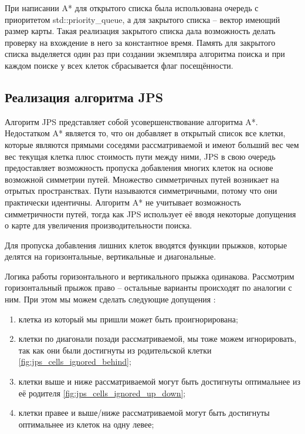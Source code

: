 При написании A* для открытого списка была использована очередь с приоритетом std::priority\_queue, а для закрытого списка -- вектор имеющий размер карты. Такая реализация закрытого списка дала возможность делать проверку на вхождение в него за константное время. Память для закрытого списка выделяется один раз при создании экземпляра алгоритма поиска и при каждом поиске у всех клеток сбрасывается флаг посещённости.

\subsection{Реализация алгоритма JPS}

Алгоритм JPS представляет собой усовершенствование алгоритма A*. Недостатком A* является то, что он добавляет в открытый список все клетки, которые являются прямыми соседями рассматриваемой и имеют больший вес чем вес текущая клетка плюс стоимость пути между ними, JPS в свою очередь предоставляет возможность пропуска добавления многих клеток на основе возможной симметрии путей. Множество симметричных путей возникает на отрытых пространствах. Пути называются симметричными, потому что они практически идентичны. Алгоритм A* не учитывает возможность симметричности путей, тогда как JPS использует её вводя некоторые допущения о карте для увеличения производительности поиска. 

Для пропуска добавления лишних клеток вводятся функции прыжков, которые делятся на горизонтальные, вертикальные и диагональные.

Логика работы горизонтального и вертикального прыжка одинакова. Рассмотрим горизонтальный прыжок право -- остальные варианты происходят по аналогии с ним. При этом мы можем сделать следующие допущения \cite{JPS_DETAILS}:

\begin{enumerate}
    \item клетка из который мы пришли может быть проигнорирована;
    \item клетки по диагонали позади рассматриваемой, мы тоже можем игнорировать, так как они были достигнуты из родительской клетки \cref{fig:jps_cells_ignored_behind};
    \item клетки выше и ниже рассматриваемой могут быть достигнуты оптимальнее из её родителя \cref{fig:jps_cells_ignored_up_down};
    \item клетки правее и выше/ниже рассматриваемой могут быть достигнуты оптимальнее из клеток на одну левее;
\end{enumerate}

